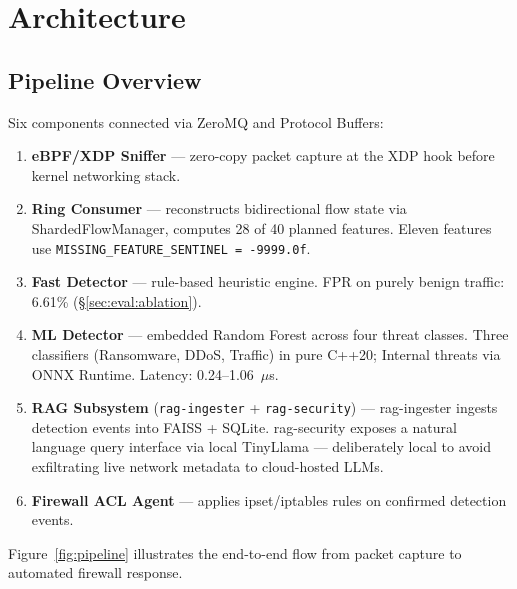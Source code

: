 \documentclass[11pt,a4paper]{article}
\begin{document}
    \section{Architecture}

    \subsection{Pipeline Overview}

    Six components connected via ZeroMQ and Protocol Buffers:

    \begin{enumerate}
        \item \textbf{eBPF/XDP Sniffer} --- zero-copy packet capture at the XDP hook before kernel
        networking stack.
        \item \textbf{Ring Consumer} --- reconstructs bidirectional flow state via
        ShardedFlowManager, computes 28 of 40 planned features. Eleven features use
        \texttt{MISSING\_FEATURE\_SENTINEL = -9999.0f}.
        \item \textbf{Fast Detector} --- rule-based heuristic engine. FPR on purely benign traffic:
        6.61\% (\S\ref{sec:eval:ablation}).
        \item \textbf{ML Detector} --- embedded Random Forest across four threat classes. Three
        classifiers (Ransomware, DDoS, Traffic) in pure C++20; Internal threats via ONNX Runtime.
        Latency: 0.24--1.06~$\mu$s.
        \item \textbf{RAG Subsystem} (\texttt{rag-ingester} + \texttt{rag-security}) ---
        rag-ingester ingests detection events into FAISS + SQLite. rag-security exposes a natural
        language query interface via local TinyLlama --- deliberately local to avoid exfiltrating
        live network metadata to cloud-hosted LLMs.
        \item \textbf{Firewall ACL Agent} --- applies ipset/iptables rules on confirmed detection
        events.
    \end{enumerate}

    Figure~\ref{fig:pipeline} illustrates the end-to-end flow from packet capture to
    automated firewall response.
\end{document}

